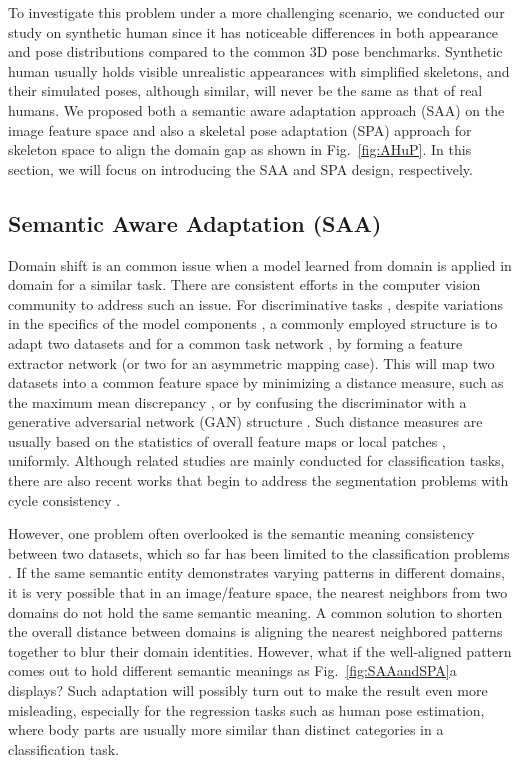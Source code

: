 \documentclass[twocolumn]{svjour3}          \smartqed  \usepackage{graphicx}
\newcommand{\figref}[1]{Fig.~\ref{#1}}
\begin{document}
To investigate this problem under a more challenging scenario, we conducted our study on synthetic human since it has noticeable differences in both appearance and pose distributions compared to the common 3D pose benchmarks. Synthetic human usually holds visible unrealistic appearances with simplified skeletons, and their simulated poses, although similar, will never be the same as that of real humans. We proposed both a semantic aware adaptation approach (SAA) on the image feature space and also a skeletal pose adaptation (SPA) approach for skeleton space to align the domain gap as shown in \mbox{\figref{fig:AHuP}}. In this section, we will focus on introducing the SAA and SPA design, respectively.



\subsection{Semantic Aware Adaptation (SAA)}
\label{sec:SAA}


Domain shift is an common issue when a model learned from domain  is applied in domain  for a similar task. 
There are consistent efforts in the computer vision community to address such an issue. For discriminative tasks \cite{tzeng2017adversarial}, despite  variations in the specifics of the model components  \cite{hoffman2018cycada,tzeng2015simultaneous}, a commonly employed structure is to adapt two datasets  and   for a common task network , by forming a feature extractor network  (or two for an  asymmetric mapping case). 
This will map two datasets into a common feature space by minimizing a distance measure, such as the maximum mean discrepancy \cite{quinonero2008covariate}, or by confusing the discriminator with a generative adversarial network (GAN) structure \cite{tzeng2017adversarial}. 
Such distance measures are usually based on the statistics of overall feature maps \cite{tzeng2017adversarial} or local patches \cite{isola2017image}, uniformly. Although related studies are mainly conducted for classification tasks, there are also recent works that begin to address the segmentation problems with cycle consistency \cite{hoffman2018cycada}. 



However, one problem often overlooked is the semantic meaning consistency between two datasets, which so far has been limited to the classification problems \cite{Luo_2019_CVPR}. 
If the same semantic entity demonstrates varying patterns in different domains, it is very possible that in an image/feature space, the nearest neighbors from two domains do not hold the same semantic meaning. A common solution to shorten the overall distance between domains is aligning the nearest neighbored patterns together to blur their domain identities. However, what if the well-aligned pattern comes out to hold different semantic meanings as \figref{fig:SAAandSPA}a displays? Such adaptation will possibly turn out to make the result even more misleading, especially for the regression tasks such as human pose estimation, where body parts are usually more similar than distinct categories in a classification task.    
\end{document}
